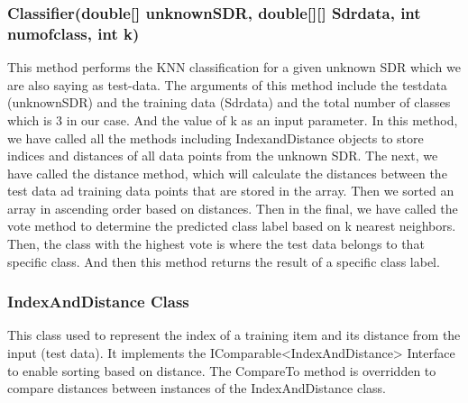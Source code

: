 \documentclass[conference]{IEEEtran}
\begin{document}
\subsubsection{Classifier(double[] unknownSDR, double[][] Sdrdata, int numofclass, int k)}
This method performs the KNN classification for a given unknown SDR which we are also saying as test-data. The arguments of this method include the testdata (unknownSDR) and the training data (Sdrdata) and the total number of classes which is 3 in our case. And the value of k as an input parameter. In this method, we have called all the methods including IndexandDistance objects to store indices and distances of all data points from the unknown SDR. The next, we have called the distance method, which will calculate the distances between the test data ad training data points that are stored in the array. Then we sorted an array in ascending order based on distances. Then in the final, we have called the vote method to determine the predicted class label based on k nearest neighbors. Then, the class with the highest vote is where the test data belongs to that specific class. And then this method returns the result of a specific class label. 


\subsubsection{IndexAndDistance Class}
This class used to represent the index of a training item and its distance from the input (test data). It implements the IComparable<IndexAndDistance> Interface to enable sorting based on distance. The CompareTo method is overridden to compare distances between instances of the IndexAndDistance class.
\end{document}
